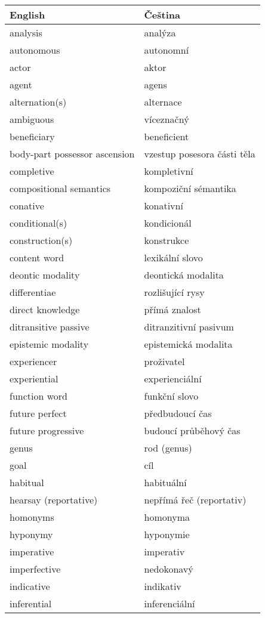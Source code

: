 \documentclass[a4paper,landscape,headrule,footrule,xetex]{foils}
\begin{document}
\begin{longtable}{ll}
  English & Čeština \\ \hline
  \endhead 
 analysis & analýza \\
 autonomous & autonomní \\
 actor & aktor \\
 agent & agens \\
 alternation(s) & alternace \\
 ambiguous & víceznačný \\
 beneficiary & beneficient \\
 body-part possessor ascension & vzestup posesora části těla \\
 completive & kompletivní \\
 compositional semantics & kompoziční sémantika \\
 conative & konativní \\
 conditional(s) & kondicionál \\
 construction(s) & konstrukce \\
 content word & lexikální slovo \\
 deontic modality & deontická modalita \\
 differentiae& rozlišující rysy \\
 direct knowledge & přímá znalost \\
 ditransitive passive & ditranzitivní pasivum \\
 epistemic modality & epistemická modalita \\
 experiencer & proživatel \\
 experiential & experienciální \\
 function word & funkční slovo \\
 future perfect & předbudoucí čas \\
 future progressive & budoucí průběhový čas \\
 genus & rod (genus) \\
 goal & cíl \\
 habitual & habituální \\
 hearsay (reportative) & nepřímá řeč (reportativ) \\
 homonyms & homonyma \\
 hyponymy & hyponymie \\
 imperative & imperativ \\
 imperfective & nedokonavý \\
 indicative & indikativ \\
 inferential & inferenciální \\

\end{longtable}
\end{document}
